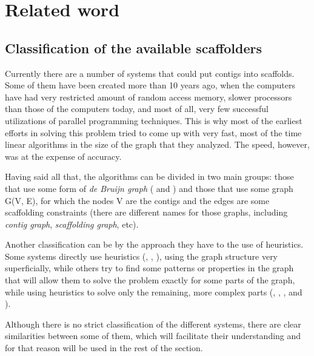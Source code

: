 \documentclass[11pt]{article}
\begin{document}

\section{Related word} %
\label{sec:Related word}

\subsection{Classification of the available scaffolders} %
\label{sub:Classification of the available scaffolders}
Currently there are a number of systems that could put contigs into scaffolds.
Some of them have been created more than 10 years ago, when the computers have
had very restricted amount of random access memory, slower processors than
those of the computers today, and most of all, very few successful utilizations
of parallel programming techniques. This is why most of the earliest efforts in
solving this problem tried to come up with very fast, most of the time linear
algorithms in the size of the graph that they analyzed. The speed, however, was
at the expense of accuracy.

Having said all that, the algorithms can be divided in two main groups: those
that use some form of \emph{de Bruijn graph} (\cite{pevzner} and
\cite{velvet-scaffolding}) and those that use some graph G(V, E), for which the
nodes V are the contigs and the edges are some scaffolding constraints (there
are different names for those graphs, including \emph{contig graph},
\emph{scaffolding graph}, etc).

Another classification can be by the approach they have to the use of
heuristics. Some systems directly use heuristics (\cite{greedy-path-merging},
\cite{SOAPdenovo}, \cite{SSPACE}), using the graph structure very superficially,
while others try to find some patterns or properties in the graph that will
allow them to solve the problem exactly for some parts of the graph, while using
heuristics to solve only the remaining, more complex parts (\cite{SOPRA},
\cite{MIR}, \cite{Opera}, \cite{SCARPA} and \cite{grass}).

Although there is no strict classification of the different systems, there are
clear similarities between some of them, which will facilitate their
understanding and for that reason will be used in the rest of the section.
\end{document}
